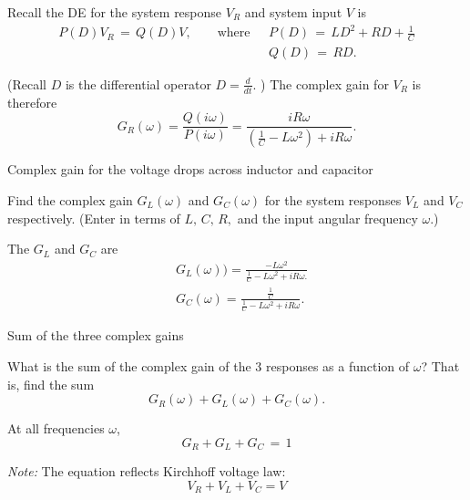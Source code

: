 Recall the DE for the system response $V _R$ and system input $V$ is
\begin{align*}
  \displaystyle  P(D) V_ R\, =\,  Q(D) V,\qquad \text {where }\, \,
  &\displaystyle  P(D)\, =\, L D^2 +R D+\frac{1}{C} \\
  &\displaystyle Q(D)\, =\,  RD.
\end{align*}

(Recall $D$ is the differential operator $D=\frac{d}{dt}$. ) The complex gain for $V _R$ is therefore
\begin{equation*}
  \displaystyle  G_ R(\omega )
  \displaystyle =
  \displaystyle \frac{Q(i\omega )}{P(i\omega )}
  \displaystyle =
  \displaystyle \frac{iR\omega }{\left(\frac{1}{C}-L\omega ^2\right)+iR\omega }.
\end{equation*}

\begin{exercise}
  Complex gain for the voltage drops across inductor and capacitor
\end{exercise}

Find the complex gain $G _L(\omega)$ and $G _C(\omega)$ for
the system responses $V _L$ and $V_C$ respectively.
(Enter in terms of $L,\, C,\, R,$ and the input angular frequency $\omega$.)

The $G _L$ and $G _C$ are
\begin{align*}
    &G _L(\omega) ) =  \frac{-L \omega ^2}{\frac{1}{C} - L \omega ^2 + iR \omega. } \\
    &G _C(\omega) =  \frac{\frac{1}{C}}{\frac{1}{C} - L \omega ^2 + iR \omega}.    
\end{align*}

\begin{exercise}
  Sum of the three complex gains
\end{exercise}
What is the sum of the complex gain of the 3 responses as a function of $\omega$?
That is, find the sum
\begin{equation*}
  G_ R (\omega )+G_ L(\omega )+G_ C(\omega ).
\end{equation*}

At all frequencies $\omega$,
\begin{equation*}
  G_ R + G_ L + G_ C\, =\, 1
\end{equation*}

\emph{Note:} The equation reflects Kirchhoff voltage law:
\begin{equation*}
  V_ R+V_ L+V_ C=V
\end{equation*}

\clearpage

